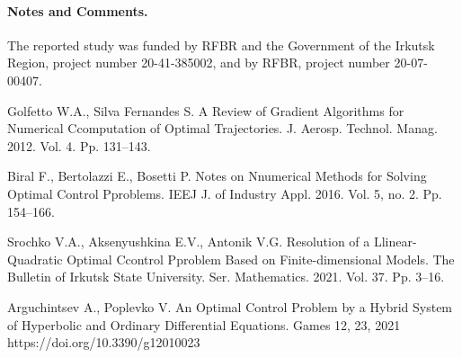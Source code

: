 \documentclass[12pt]{llncs}
\begin{document}
\paragraph{Notes and Comments.}
The reported study was funded by RFBR and the Government of the Irkutsk Region, project
number 20-41-385002, and by RFBR, project number 20-07-00407.
%
%
\begin{thebibliography}{5}
%
Golfetto  W.A., Silva Fernandes  S. 
A Review of Gradient Algorithms for Numerical Ccomputation of Optimal Trajectories.
J. Aerosp. Technol. Manag. 2012. Vol. 4. Pp. 131--143.

Biral  F., Bertolazzi  E., Bosetti  P. 
Notes on Nnumerical Methods for Solving Optimal Control Pproblems.
IEEJ J. of Industry Appl. 2016. Vol.  5, no. 2. Pp. 154--166.

Srochko  V.A., Aksenyushkina  E.V., Antonik  V.G. 
Resolution of a Llinear-Quadratic Optimal Ccontrol Pproblem Based on Finite-dimensional Models.
The Bulletin of Irkutsk State University. Ser. Mathematics. 2021. Vol. 37. Pp. 3--16.

Arguchintsev  A., Poplevko  V. 
An Optimal Control Problem by a Hybrid System of Hyperbolic and Ordinary Differential Equations.
Games 12, 23, 2021 https://doi.org/10.3390/g12010023 

\end{thebibliography}
\end{document}
